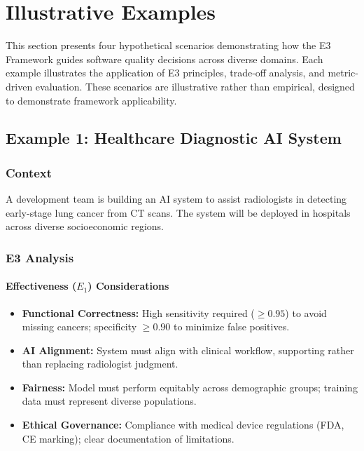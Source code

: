 
\section{Illustrative Examples}
\label{sec:illustrative_examples}

This section presents four hypothetical scenarios demonstrating how the E3 Framework guides software quality decisions across diverse domains. Each example illustrates the application of E3 principles, trade-off analysis, and metric-driven evaluation. These scenarios are illustrative rather than empirical, designed to demonstrate framework applicability.

\subsection{Example 1: Healthcare Diagnostic AI System}

\subsubsection{Context}

A development team is building an AI system to assist radiologists in detecting early-stage lung cancer from CT scans. The system will be deployed in hospitals across diverse socioeconomic regions.

\subsubsection{E3 Analysis}

\paragraph{Effectiveness ($E_1$) Considerations}

\begin{itemize}[leftmargin=2em]
    \item \textbf{Functional Correctness:} High sensitivity required ($\geq 0.95$) to avoid missing cancers; specificity $\geq 0.90$ to minimize false positives.
    \item \textbf{AI Alignment:} System must align with clinical workflow, supporting rather than replacing radiologist judgment.
    \item \textbf{Fairness:} Model must perform equitably across demographic groups; training data must represent diverse populations.
    \item \textbf{Ethical Governance:} Compliance with medical device regulations (FDA, CE marking); clear documentation of limitations.
\end{itemize}


